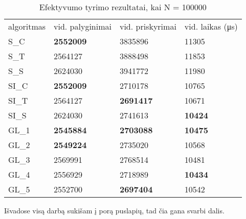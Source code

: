 \documentclass{VUMIFInfKursinis}
\begin{document}
\begin{table}[H]
  \caption{Efektyvumo tyrimo rezultatai, kai N = 100000}
  \label{results_100000}
  \centering
  \begin{tabular}{llll}
    algoritmas & vid. palyginimai                         & vid. priskyrimai                         & vid. laikas (μs)                       \\
    S\_C       & \cellcolor[HTML]{70AD47}\textbf{2552009} & 3835896                                  & 11305                                  \\
    S\_T       & 2564127                                  & 3888498                                  & 11853                                  \\
    S\_S       & 2624030                                  & 3941772                                  & 11980                                  \\
    SI\_C      & \cellcolor[HTML]{70AD47}\textbf{2552009} & 2710178                                  & 10765                                  \\
    SI\_T      & 2564127                                  & \cellcolor[HTML]{70AD47}\textbf{2691417} & 10671                                  \\
    SI\_S      & 2624030                                  & 2741613                                  & \cellcolor[HTML]{70AD47}\textbf{10424} \\
    GL\_1 & \cellcolor[HTML]{70AD47}\textbf{2545884} & \cellcolor[HTML]{70AD47}\textbf{2703088} & \cellcolor[HTML]{70AD47}\textbf{10475} \\
    GL\_2      & \cellcolor[HTML]{70AD47}\textbf{2549224} & 2735020                                  & 10568                                  \\
    GL\_3      & 2569991                                  & 2768514                                  & 10481                                  \\
    GL\_4      & 2556929                                  & 2718989                                  & \cellcolor[HTML]{70AD47}\textbf{10434} \\
    GL\_5      & 2552700                                  & \cellcolor[HTML]{70AD47}\textbf{2697404} & 10542                
  \end{tabular}
\end{table}


Išvadose visą darbą sukišam į porą puslapių, tad čia gana svarbi dalis.
\end{document}

